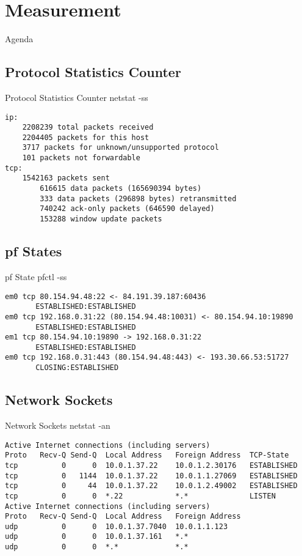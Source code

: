 \documentclass[14pt]{beamer}
\begin{document}
\section{Measurement}
\begin{frame}{Agenda}
\tableofcontents[currentsection]
\end{frame}

\subsection{Protocol Statistics Counter}
\begin{frame}[fragile]{Protocol Statistics Counter}
netstat -ss
\scriptsize
\begin{verbatim}
ip:
    2208239 total packets received
    2204405 packets for this host
    3717 packets for unknown/unsupported protocol
    101 packets not forwardable
tcp:
    1542163 packets sent
        616615 data packets (165690394 bytes)
        333 data packets (296898 bytes) retransmitted
        740242 ack-only packets (646590 delayed)
        153288 window update packets
\end{verbatim}
\end{frame}

\subsection{pf States}
\begin{frame}[fragile]{pf State}
pfctl -ss
\scriptsize
\begin{verbatim}
em0 tcp 80.154.94.48:22 <- 84.191.39.187:60436
       ESTABLISHED:ESTABLISHED
em0 tcp 192.168.0.31:22 (80.154.94.48:10031) <- 80.154.94.10:19890
       ESTABLISHED:ESTABLISHED
em1 tcp 80.154.94.10:19890 -> 192.168.0.31:22
       ESTABLISHED:ESTABLISHED
em0 tcp 192.168.0.31:443 (80.154.94.48:443) <- 193.30.66.53:51727
       CLOSING:ESTABLISHED
\end{verbatim}
\end{frame}

\subsection{Network Sockets}
\begin{frame}[fragile]{Network Sockets}
netstat -an
\scriptsize
\begin{verbatim}
Active Internet connections (including servers)
Proto   Recv-Q Send-Q  Local Address   Foreign Address  TCP-State
tcp          0      0  10.0.1.37.22    10.0.1.2.30176   ESTABLISHED
tcp          0   1144  10.0.1.37.22    10.0.1.1.27069   ESTABLISHED
tcp          0     44  10.0.1.37.22    10.0.1.2.49002   ESTABLISHED
tcp          0      0  *.22            *.*              LISTEN
Active Internet connections (including servers)
Proto   Recv-Q Send-Q  Local Address   Foreign Address
udp          0      0  10.0.1.37.7040  10.0.1.1.123
udp          0      0  10.0.1.37.161   *.*
udp          0      0  *.*             *.*
\end{verbatim}
\end{frame}
\end{document}
